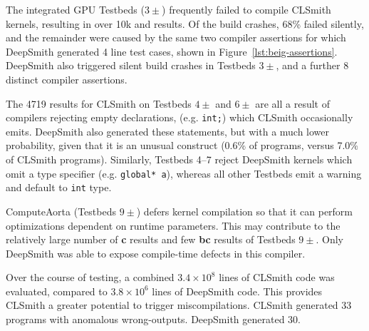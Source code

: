 The integrated GPU Testbeds ($3\pm$) frequently failed to compile CLSmith kernels, resulting in over 10k \bc and \bto results.
Of the build crashes, 68\% failed silently, and the remainder were caused by the same two compiler assertions for which DeepSmith generated 4 line test cases, shown in Figure~\ref{lst:beig-assertions}. DeepSmith also triggered silent build crashes in Testbeds $3\pm$, and a further 8 distinct compiler assertions.

The 4719 \abf results for CLSmith on Testbeds $4\pm$ and $6\pm$ are all a result of compilers rejecting empty declarations, (e.g. \texttt{int;}) which CLSmith occasionally emits. DeepSmith also generated these statements, but with a much lower probability, given that it is an unusual construct (0.6\% of programs, versus 7.0\% of CLSmith programs).
Similarly, Testbeds 4--7 reject DeepSmith kernels which omit a type specifier (e.g. \texttt{global* a}), whereas all other Testbeds emit a warning and default to \texttt{int} type.



ComputeAorta (Testbeds $9\pm$) defers kernel compilation so that it can perform optimizations dependent on runtime parameters. This may contribute to the relatively large number of \textbf{c} results and few \textbf{bc} results of Testbeds $9\pm$. Only DeepSmith was able to expose compile-time defects in this compiler.


Over the course of testing, a combined $3.4 \times 10^8$ lines of CLSmith code was evaluated, compared to $3.8 \times 10^6$ lines of DeepSmith code. This provides CLSmith a greater potential to trigger miscompilations. CLSmith generated 33 programs with anomalous wrong-outputs. DeepSmith generated 30.


